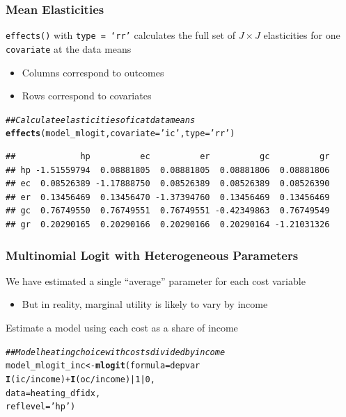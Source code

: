 \documentclass{beamer}\usepackage[]{graphicx}\usepackage[]{color}
\makeatletter
\newcommand{\hlnum}[1]{\textcolor[rgb]{0.686,0.059,0.569}{#1}}%
\newcommand{\hlstr}[1]{\textcolor[rgb]{0.192,0.494,0.8}{#1}}%
\newcommand{\hlcom}[1]{\textcolor[rgb]{0.678,0.584,0.686}{\textit{#1}}}%
\newcommand{\hlopt}[1]{\textcolor[rgb]{0,0,0}{#1}}%
\newcommand{\hlstd}[1]{\textcolor[rgb]{0.345,0.345,0.345}{#1}}%
\newcommand{\hlkwb}[1]{\textcolor[rgb]{0.69,0.353,0.396}{#1}}%
\newcommand{\hlkwc}[1]{\textcolor[rgb]{0.333,0.667,0.333}{#1}}%
\newcommand{\hlkwd}[1]{\textcolor[rgb]{0.737,0.353,0.396}{\textbf{#1}}}%
\newenvironment{kframe}{%
 \def\at@end@of@kframe{}%
 \ifinner\ifhmode%
  \def\at@end@of@kframe{\end{minipage}}%
  \begin{minipage}{\columnwidth}%
 \fi\fi%
 \def\FrameCommand##1{\hskip\@totalleftmargin \hskip-\fboxsep
 \colorbox{shadecolor}{##1}\hskip-\fboxsep
     \hskip-\linewidth \hskip-\@totalleftmargin \hskip\columnwidth}%
 \MakeFramed {\advance\hsize-\width
   \@totalleftmargin\z@ \linewidth\hsize
   \@setminipage}}%
 {\par\unskip\endMakeFramed%
 \at@end@of@kframe}
\newenvironment{knitrout}{}{} %
\makeatother
\begin{document}
\begin{frame}[fragile]\frametitle{Mean Elasticities}
	  \texttt{effects()} with \texttt{type = `rr'} calculates the full set of $J \times J$ elasticities for one \texttt{covariate} at the data means
	  \begin{itemize}
        \item Columns correspond to outcomes
        \item Rows correspond to covariates
    \end{itemize}
\begin{knitrout}\footnotesize
{}\color{fgcolor}\begin{kframe}
\begin{alltt}
\hlcom{## Calculate elasticities of ic at data means}
\hlkwd{effects}\hlstd{(model_mlogit,} \hlkwc{covariate} \hlstd{=} \hlstr{'ic'}\hlstd{,} \hlkwc{type} \hlstd{=} \hlstr{'rr'}\hlstd{)}
\end{alltt}
\begin{verbatim}
##             hp          ec          er          gc          gr
## hp -1.51559794  0.08881805  0.08881805  0.08881806  0.08881806
## ec  0.08526389 -1.17888750  0.08526389  0.08526389  0.08526390
## er  0.13456469  0.13456470 -1.37394760  0.13456469  0.13456469
## gc  0.76749550  0.76749551  0.76749551 -0.42349863  0.76749549
## gr  0.20290165  0.20290166  0.20290166  0.20290164 -1.21031326
\end{verbatim}
\end{kframe}
\end{knitrout}
\end{frame}

\begin{frame}[fragile]\frametitle{Multinomial Logit with Heterogeneous Parameters}
    We have estimated a single ``average'' parameter for each cost variable
    \begin{itemize}
        \item But in reality, marginal utility is likely to vary by income
    \end{itemize}
    \vspace{2ex}
    Estimate a model using each cost as a share of income
\begin{knitrout}\footnotesize
{}\color{fgcolor}\begin{kframe}
\begin{alltt}
\hlcom{## Model heating choice with costs divided by income}
\hlstd{model_mlogit_inc} \hlkwb{<-} \hlkwd{mlogit}\hlstd{(}\hlkwc{formula} \hlstd{= depvar} \hlopt{~}
                             \hlkwd{I}\hlstd{(ic} \hlopt{/} \hlstd{income)} \hlopt{+} \hlkwd{I}\hlstd{(oc} \hlopt{/} \hlstd{income)} \hlopt{|} \hlnum{1} \hlopt{|} \hlnum{0}\hlstd{,}
                           \hlkwc{data} \hlstd{= heating_dfidx,}
                           \hlkwc{reflevel} \hlstd{=} \hlstr{'hp'}\hlstd{)}
\end{alltt}
\end{kframe}
\end{knitrout}
\end{frame}
\end{document}
